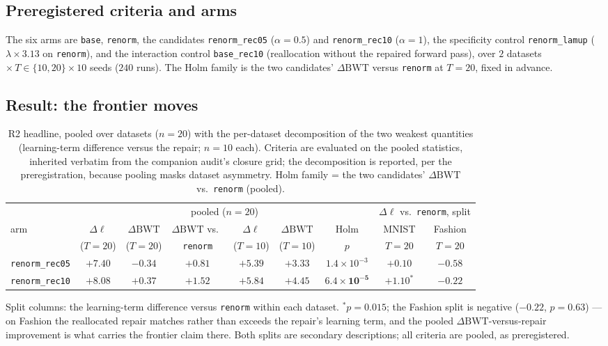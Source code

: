 \documentclass[10pt]{article}
\newcommand{\gain}{\Delta\ell}
\newcommand{\dbwt}{\Delta\mathrm{BWT}}
\begin{document}
\subsection{Preregistered criteria and arms}
The six arms are \texttt{base}, \texttt{renorm}, the candidates
\texttt{renorm\_rec05} ($\alpha{=}0.5$) and \texttt{renorm\_rec10}
($\alpha{=}1$), the specificity control \texttt{renorm\_lamup}
($\lambda{\times}3.13$ on \texttt{renorm}), and the interaction control
\texttt{base\_rec10} (reallocation without the repaired forward pass), over
$2$ datasets $\times\,T\in\{10,20\}\times10$ seeds ($240$ runs). The Holm
family is the two candidates' $\dbwt$ versus \texttt{renorm} at $T{=}20$,
fixed in advance.

\subsection{Result: the frontier moves}
\begin{table}[t]
\centering
\caption{R2 headline, pooled over datasets ($n{=}20$) with the per-dataset
decomposition of the two weakest quantities (learning-term difference
versus the repair; $n{=}10$ each). Criteria are evaluated on the pooled
statistics, inherited verbatim from the companion audit's closure grid;
the decomposition is reported, per the preregistration, because pooling
masks dataset asymmetry. Holm family = the two candidates' $\dbwt$
vs.\ \texttt{renorm} (pooled).}
\label{tab:r2}
\small
\setlength{\tabcolsep}{3.4pt}
\begin{tabular}{lcccccc|cc}
\toprule
 & \multicolumn{6}{c|}{pooled ($n{=}20$)} & \multicolumn{2}{c}{$\gain$ vs.\ \texttt{renorm}, split} \\
arm & $\gain$ & $\dbwt$ & $\dbwt$ vs.\ & $\gain$ & $\dbwt$ & Holm & MNIST & Fashion \\
 & ($T{=}20$) & ($T{=}20$) & \texttt{renorm} & ($T{=}10$) & ($T{=}10$) & $p$ & $T{=}20$ & $T{=}20$ \\
\midrule
\texttt{renorm\_rec05} & $+7.40$ & $-0.34$ & $+0.81$ & $+5.39$ & $+3.33$ & $1.4{\times}10^{-3}$ & $+0.10$ & $-0.58$ \\
\texttt{renorm\_rec10} & $\mathbf{+8.08}$ & $\mathbf{+0.37}$ & $\mathbf{+1.52}$ & $\mathbf{+5.84}$ & $\mathbf{+4.45}$ & $\mathbf{6.4{\times}10^{-5}}$ & $+1.10^{*}$ & $-0.22$ \\
\bottomrule
\end{tabular}

\vspace{2pt}
\raggedright\footnotesize Split columns: the learning-term difference
versus \texttt{renorm} within each dataset. $^{*}p{=}0.015$; the Fashion
split is negative ($-0.22$, $p{=}0.63$) --- on Fashion the reallocated
repair matches rather than exceeds the repair's learning term, and the
pooled $\dbwt$-versus-repair improvement is what carries the frontier
claim there. Both splits are secondary descriptions; all criteria are
pooled, as preregistered.
\end{table}
\end{document}
